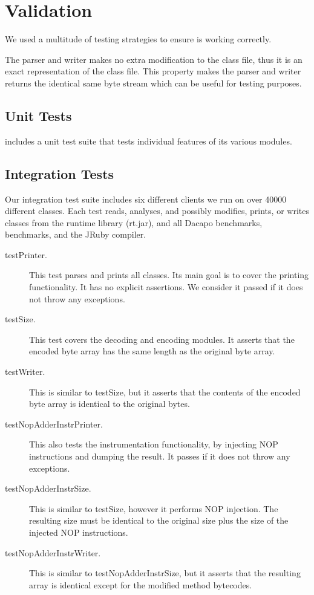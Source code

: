 \section{Validation}
\label{sec:jnif-test}

We used a multitude of testing strategies to ensure \jnif{} is working correctly.

The \jnif{} parser and writer makes no extra modification to the class file, 
thus it is an exact representation of the class file. 
This property makes the parser and writer returns the identical same byte stream which can be useful for testing purposes.


\subsection*{Unit Tests}

\jnif{} includes a unit test suite that tests individual features of its various modules.

\subsection*{Integration Tests}

Our integration test suite includes six different \jnif{} clients we run on over 40000 different classes.
Each test reads, analyses, and possibly modifies, prints, or writes classes from the \java{} runtime library (rt.jar),
and all Dacapo benchmarks, \scala{} benchmarks, and the JRuby compiler.

\begin{description}
\item[testPrinter.]
This test parses and prints all classes.
Its main goal is to cover the printing functionality.
It has no explicit assertions.
We consider it passed if it does not throw any exceptions.
\item[testSize.]
This test covers the decoding and encoding modules.
It asserts that the encoded byte array has the same length as the original byte array.
\item[testWriter.]
This is similar to testSize,
but it asserts that the contents of the encoded byte array is identical to the original bytes.
\item[testNopAdderInstrPrinter.]
This also tests the instrumentation functionality,
by injecting NOP instructions and dumping the result.
It passes if it does not throw any exceptions.
\item[testNopAdderInstrSize.]
This is similar to testSize, however it performs NOP injection.
The resulting size must be identical to the original size plus the size of the injected NOP instructions.
\item[testNopAdderInstrWriter.]
This is similar to testNopAdderInstrSize,
but it asserts that the resulting array is identical except for the modified method bytecodes.
\end{description}


